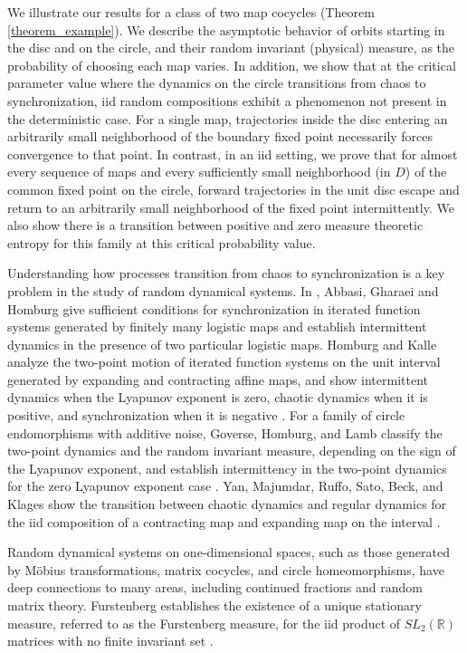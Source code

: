 \documentclass[12pt,reqno]{amsart}
\numberwithin{theorem}{section}
\begin{document}
We illustrate our results for a class of two map cocycles (Theorem \ref{theorem_example}). We describe the asymptotic behavior of orbits starting in the disc and on the circle, and their random invariant (physical) measure, as the probability of choosing each map varies. In addition, we show that at the critical parameter value where the dynamics on the circle transitions from chaos to synchronization, iid random compositions exhibit a phenomenon not present in the deterministic case. For a single map, trajectories inside the disc entering an arbitrarily small neighborhood of the boundary fixed point necessarily forces convergence to that point. In contrast, in an iid setting, we prove that for almost every sequence of maps and every sufficiently small neighborhood (in $D$) of the common fixed point on the circle, forward trajectories in the unit disc escape and return to an arbitrarily small neighborhood of the fixed point intermittently.  We also show there is a transition between positive and zero measure theoretic entropy for this family at this critical probability value.

 Understanding how processes transition from chaos to synchronization is a key problem in the study of random dynamical systems. In \cite{synchronization_intermittency}, Abbasi, Gharaei and Homburg give sufficient conditions for synchronization in iterated function systems generated by finitely many logistic maps and establish intermittent dynamics in the presence of two particular logistic maps. Homburg and Kalle analyze the two-point motion of iterated function systems
on the unit interval generated by expanding and contracting
aﬃne maps, and show intermittent dynamics when the Lyapunov exponent is zero, chaotic dynamics when it is positive, and synchronization when it is negative \cite{homburg_kalle_intermittency}. For a family of circle endomorphisms with additive noise, Goverse, Homburg, and Lamb classify the two-point dynamics and the random invariant measure, depending on the sign of the Lyapunov exponent, and establish intermittency in the two-point dynamics for the zero Lyapunov exponent case \cite{random_circle_endo}. Yan, Majumdar, Ruffo, Sato, Beck, and Klages show the transition between chaotic dynamics and regular dynamics for the iid composition of a contracting map and expanding map on the interval \cite{simple_random_map}.

Random dynamical systems on one‑dimensional spaces, such as those generated by Möbius transformations, matrix cocycles, and circle homeomorphisms, have deep connections to many areas, including continued fractions and random matrix theory. Furstenberg establishes the existence of a unique stationary measure, referred to as the Furstenberg measure, for the iid product of $SL_2(\mathbb{R})$ matrices with no finite invariant set \cite{furstenberg}. 
\end{document}
